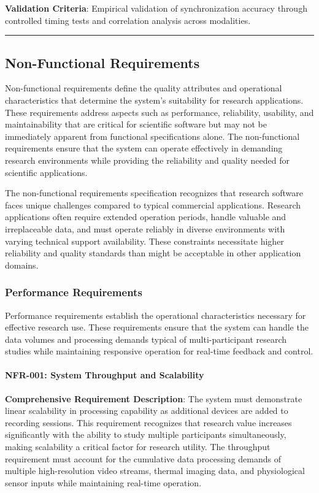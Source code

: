 \documentclass[12pt,a4paper]{report}
\begin{document}
\textbf{Validation Criteria}: Empirical validation of synchronization accuracy through controlled timing tests and
correlation analysis across modalities.

\hrule

\subsection{Non-Functional Requirements}

Non-functional requirements define the quality attributes and operational characteristics that determine the system's
suitability for research applications. These requirements address aspects such as performance, reliability, usability,
and maintainability that are critical for scientific software but may not be immediately apparent from functional
specifications alone. The non-functional requirements ensure that the system can operate effectively in demanding
research environments while providing the reliability and quality needed for scientific applications.

The non-functional requirements specification recognizes that research software faces unique challenges compared to
typical commercial applications. Research applications often require extended operation periods, handle valuable and
irreplaceable data, and must operate reliably in diverse environments with varying technical support availability. These
constraints necessitate higher reliability and quality standards than might be acceptable in other application domains.

\subsubsection{Performance Requirements}

Performance requirements establish the operational characteristics necessary for effective research use. These
requirements ensure that the system can handle the data volumes and processing demands typical of multi-participant
research studies while maintaining responsive operation for real-time feedback and control.

\paragraph{NFR-001: System Throughput and Scalability}

\textbf{Comprehensive Requirement Description}: The system must demonstrate linear scalability in processing capability as
additional devices are added to recording sessions. This requirement recognizes that research value increases
significantly with the ability to study multiple participants simultaneously, making scalability a critical factor for
research utility. The throughput requirement must account for the cumulative data processing demands of multiple
high-resolution video streams, thermal imaging data, and physiological sensor inputs while maintaining real-time
operation.
\end{document}
